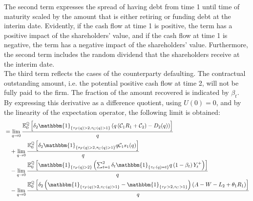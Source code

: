 \documentclass[main.tex]{subfiles}
\begin{document}
        The second term expresses the spread of having debt from time 1 until time of maturity scaled by the amount that is either retiring or funding debt at the interim date.
        Evidently, if the cash flow at time 1 is positive, the term has a positive impact of the shareholders' value,
        and if the cash flow at time 1 is negative, the term has a negative impact of the shareholders' value.
        Furthermore, the second term includes the random dividend that the shareholders receive at the interim date.
        \\
        The third term reflects the cases of the counterparty defaulting.
        The contractual outstanding amount, i.e. the potential positive cash flow at time 2, will not be fully paid to the firm.
        The fraction of the amount recovered is indicated by $\beta_{t}$.
        \\
        By expressing this derivative as a difference quotient, using $U(0)=0$,
        and by the linearity of the expectation operator,
        the following limit is obtained:
        \begin{align*}
            &=
            \lim_{q \rightarrow 0}
            \frac{
                \mathbb{E}_{0}^{\rnmeasure}\left[
                    \delta_{2} \mathbbm{1}_{\{\tau_{F}(q)>2,\tau_{C}(q)>1\}}
                    \left(
                        q\left(\mathcal{C}_{1} R_{1} + \mathcal{C}_{2}\right)
                        - D_{2}(q)
                    \right)
                \right]
            }{
                q
            }
            \\
            &\quad+
            \lim_{q \rightarrow 0}
            \frac{
                \mathbb{E}_{0}^{\rnmeasure}\left[
                    \delta_2 \mathbbm{1}_{\{\tau_{F}(q)>2,\tau_{C}(q)>1\}}
                    q\mathcal{C}_{1} s_1(q)
                \right]
            }{
                q
            }
            \\
            &\quad-
            \lim_{q \rightarrow 0}
            \frac{
                \mathbb{E}_{0}^{\rnmeasure}\left[
                    \mathbbm{1}_{\{\tau_{F}(q)>2\}}
                    \left(
                        \sum_{t=1}^{2} \delta_{t} \mathbbm{1}_{\{\tau_{C}(q)=t\}}q\left(1-\beta_t\right)Y_{t}^{+}
                    \right)
                \right]
            }{
                q
            }
            \\
            &\quad-
            \lim_{q \rightarrow 0}
            \frac{
                \mathbb{E}_{0}^{\rnmeasure}\left[
                    \delta_{2} 
                    \left(\mathbbm{1}_{\{\tau_{F}(q)>2,\tau_{C}(q)>1\}} - \mathbbm{1}_{\{\tau_{F}>2,\tau_{C}>1\}}\right)
                    \left(
                        A - W
                        - L_{2}
                        + \theta_{1}R_{1}
                    \right)
                \right]
            }{
                q
            }
        \end{align*}
\end{document}

